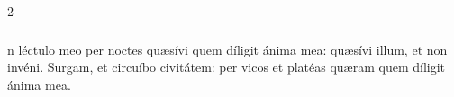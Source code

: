 \documentclass[9pt,twoside]{extarticle}
\begin{document}
\begin{multicols}{2}
\subsubsection*{\center {}}
\begin{center}\end{center}


\subsubsection*{}
n léctulo meo per noctes quæsívi quem díligit ánima mea: quæsívi illum, et non invéni. Surgam, et circuíbo civitátem: per vicos et platéas quæram quem díligit ánima mea.


\end{multicols}
\end{document}
